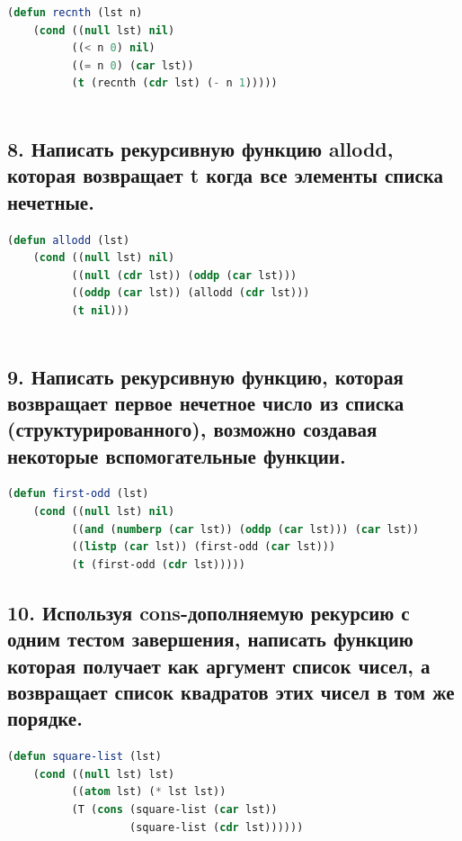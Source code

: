 \documentclass[12pt]{report}
\begin{document}
\begin{lstlisting}[label=6xd, caption=Решение задания №7, language=lisp]	
(defun recnth (lst n) 
	(cond ((null lst) nil) 
		  ((< n 0) nil) 
		  ((= n 0) (car lst)) 
		  (t (recnth (cdr lst) (- n 1)))))
	
\end{lstlisting}

\subsection*{8. Написать рекурсивную функцию allodd, которая возвращает t когда все элементы списка
	нечетные.}

\begin{lstlisting}[label=6xd, caption=Решение задания №8, language=lisp]
(defun allodd (lst) 
	(cond ((null lst) nil) 
		  ((null (cdr lst)) (oddp (car lst))) 
		  ((oddp (car lst)) (allodd (cdr lst))) 
		  (t nil)))
	
\end{lstlisting}

\subsection*{9. Написать рекурсивную функцию, которая возвращает первое нечетное число из списка
	(структурированного), возможно создавая некоторые вспомогательные функции.}

\begin{lstlisting}[label=6xd, caption=Решение задания №9, language=lisp]
(defun first-odd (lst)
	(cond ((null lst) nil)
		  ((and (numberp (car lst)) (oddp (car lst))) (car lst))
		  ((listp (car lst)) (first-odd (car lst)))
		  (t (first-odd (cdr lst)))))

\end{lstlisting}

\subsection*{10. Используя cons-дополняемую рекурсию с одним тестом завершения,
	написать функцию которая получает как аргумент список чисел, а возвращает список
	квадратов этих чисел в том же порядке.}

\begin{lstlisting}[label=6xd, caption=Решение задания №10, language=lisp]
(defun square-list (lst)
	(cond ((null lst) lst)
		  ((atom lst) (* lst lst))
		  (T (cons (square-list (car lst))
				   (square-list (cdr lst))))))
	
\end{lstlisting}
\end{document}
